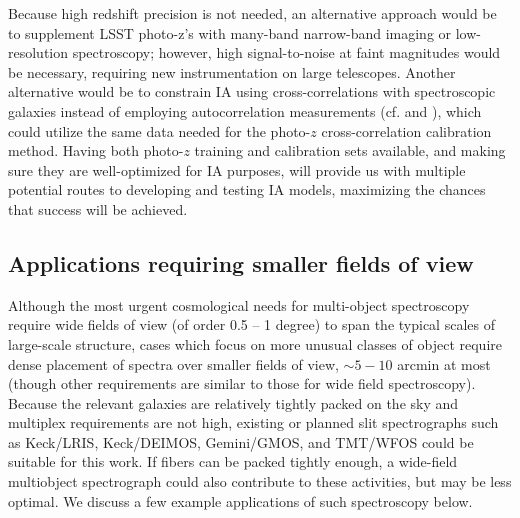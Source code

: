 Because high redshift precision is not needed, an alternative approach would be to supplement LSST photo-z's with many-band narrow-band imaging or low-resolution spectroscopy; however, high signal-to-noise at faint magnitudes would be necessary, requiring new instrumentation on large telescopes.
%
Another alternative would be to constrain IA using cross-correlations with spectroscopic galaxies instead of employing
autocorrelation measurements (cf. \citealt{Blazek} and \citealt{Chisari}), which could utilize the same data needed for the photo-$z$ cross-correlation calibration method.
Having both photo-$z$ training and calibration sets available, and making sure they are well-optimized for IA purposes, will provide us with multiple potential routes to developing and testing IA models, maximizing the chances that success will be achieved.


\subsection{Applications requiring smaller fields of view}

Although the most urgent cosmological needs for multi-object spectroscopy require wide fields of view (of order 0.5 -- 1 degree) to span the typical scales of large-scale structure, cases which focus on more unusual classes of object require dense placement of spectra over smaller fields of view, $\sim 5-10$ arcmin at most (though other requirements are similar to those for wide field spectroscopy).  Because the relevant galaxies are relatively tightly packed on the sky and multiplex requirements are not high, existing or planned slit spectrographs such as Keck/LRIS, Keck/DEIMOS, Gemini/GMOS, and TMT/WFOS could be suitable for this work.  If fibers can be packed tightly enough, a wide-field multiobject spectrograph could also contribute to these activities, but may be less optimal.  We discuss a few example applications of such spectroscopy below. 

